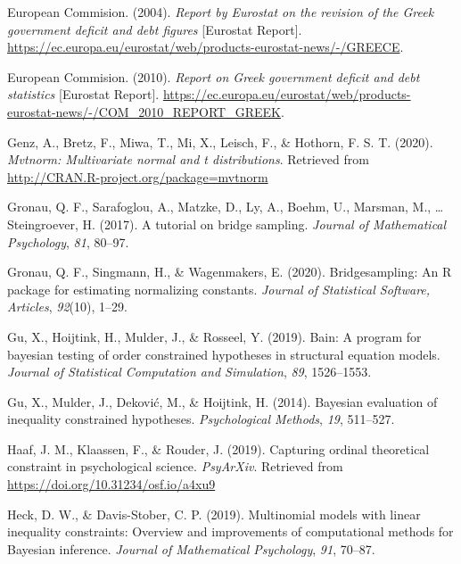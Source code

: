 \documentclass[
  english,
  man,floatsintext]{apa6}
\begin{document}
\leavevmode\hypertarget{ref-europeanCommision2004}{}%
European Commision. (2004). \emph{Report by Eurostat on the revision of the Greek government deficit and debt figures} {[}Eurostat Report{]}. \url{https://ec.europa.eu/eurostat/web/products-eurostat-news/-/GREECE}.

\leavevmode\hypertarget{ref-europeanCommision2010}{}%
European Commision. (2010). \emph{Report on Greek government deficit and debt statistics} {[}Eurostat Report{]}. \url{https://ec.europa.eu/eurostat/web/products-eurostat-news/-/COM_2010_REPORT_GREEK}.

\leavevmode\hypertarget{ref-mvtnorm}{}%
Genz, A., Bretz, F., Miwa, T., Mi, X., Leisch, F., \& Hothorn, F. S. T. (2020). \emph{Mvtnorm: Multivariate normal and t distributions}. Retrieved from \url{http://CRAN.R-project.org/package=mvtnorm}

\leavevmode\hypertarget{ref-gronau2017tutorial}{}%
Gronau, Q. F., Sarafoglou, A., Matzke, D., Ly, A., Boehm, U., Marsman, M., \ldots{} Steingroever, H. (2017). A tutorial on bridge sampling. \emph{Journal of Mathematical Psychology}, \emph{81}, 80--97.

\leavevmode\hypertarget{ref-gronau2017bridgesampling}{}%
Gronau, Q. F., Singmann, H., \& Wagenmakers, E. (2020). Bridgesampling: An R package for estimating normalizing constants. \emph{Journal of Statistical Software, Articles}, \emph{92}(10), 1--29.

\leavevmode\hypertarget{ref-gu2019bain}{}%
Gu, X., Hoijtink, H., Mulder, J., \& Rosseel, Y. (2019). Bain: A program for bayesian testing of order constrained hypotheses in structural equation models. \emph{Journal of Statistical Computation and Simulation}, \emph{89}, 1526--1553.

\leavevmode\hypertarget{ref-gu2014bayesian}{}%
Gu, X., Mulder, J., Deković, M., \& Hoijtink, H. (2014). Bayesian evaluation of inequality constrained hypotheses. \emph{Psychological Methods}, \emph{19}, 511--527.

\leavevmode\hypertarget{ref-haaf2019capturngPreprint}{}%
Haaf, J. M., Klaassen, F., \& Rouder, J. (2019). Capturing ordinal theoretical constraint in psychological science. \emph{PsyArXiv}. Retrieved from \url{https://doi.org/10.31234/osf.io/a4xu9}

\leavevmode\hypertarget{ref-heck2019multinomial}{}%
Heck, D. W., \& Davis-Stober, C. P. (2019). Multinomial models with linear inequality constraints: Overview and improvements of computational methods for Bayesian inference. \emph{Journal of Mathematical Psychology}, \emph{91}, 70--87.
\end{document}
